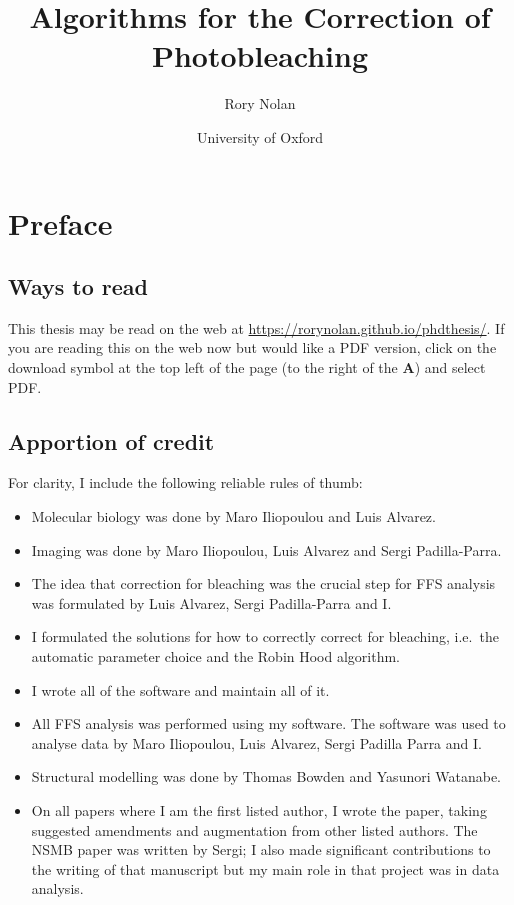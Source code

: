 \documentclass[12pt,]{book}
\title{Algorithms for the Correction of Photobleaching}
\author{Rory Nolan}
\date{University of Oxford}
\providecommand{\tightlist}{%
  \setlength{\itemsep}{0pt}\setlength{\parskip}{0pt}}
\theoremstyle{definition}
\theoremstyle{definition}
\theoremstyle{definition}
\theoremstyle{remark}
\begin{document}
\maketitle

{
\hypersetup{linkcolor=blue}
\setcounter{tocdepth}{1}
\tableofcontents
}
\chapter*{Preface}\label{preface}

\section*{Ways to read}\label{ways-to-read}

This thesis may be read on the web at
\url{https://rorynolan.github.io/phdthesis/}. If you are reading this on
the web now but would like a PDF version, click on the download symbol
at the top left of the page (to the right of the \textbf{A}) and select
PDF.

\section*{Apportion of credit}\label{apportion-of-credit}

For clarity, I include the following reliable rules of thumb:

\begin{itemize}
\tightlist
\item
  Molecular biology was done by Maro Iliopoulou and Luis Alvarez.
\item
  Imaging was done by Maro Iliopoulou, Luis Alvarez and Sergi
  Padilla-Parra.
\item
  The idea that correction for bleaching was the crucial step for FFS
  analysis was formulated by Luis Alvarez, Sergi Padilla-Parra and I.
\item
  I formulated the solutions for how to correctly correct for bleaching,
  i.e.~the automatic parameter choice and the Robin Hood algorithm.
\item
  I wrote all of the software and maintain all of it.
\item
  All FFS analysis was performed using my software. The software was
  used to analyse data by Maro Iliopoulou, Luis Alvarez, Sergi Padilla
  Parra and I.
\item
  Structural modelling was done by Thomas Bowden and Yasunori Watanabe.
\item
  On all papers where I am the first listed author, I wrote the paper,
  taking suggested amendments and augmentation from other listed
  authors. The NSMB paper \citep{HIVstoichiometry} was written by Sergi;
  I also made significant contributions to the writing of that
  manuscript but my main role in that project was in data analysis.
\end{itemize}
\end{document}
